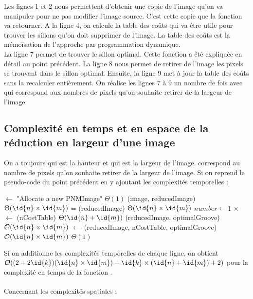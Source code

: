\documentclass[a4paper, 11pt, oneside]{article}
\begin{document}
Les lignes 1 et 2 nous permettent d'obtenir une copie de l'image qu'on va manipuler pour ne pas modifier l'image source. C'est cette copie que la fonction va retourner.
A la ligne 4, on calcule la table des coûts qui va être utile pour trouver les sillons qu'on doit supprimer de l'image. La table des coûts est la mémoïsation de l'approche par programmation dynamique.\\
La ligne 7 permet de trouver le sillon optimal. Cette fonction a été expliquée en détail au point précédent. La ligne 8 nous permet de retirer de l'image les pixels se trouvant dans le sillon optimal. Ensuite, la ligne 9 met à jour la table des coûts sans la recalculer entièrement. On réalise les lignes 7 à 9 un nombre  de fois avec  qui correspond aux nombres de pixels qu'on souhaite retirer de la largeur de l'image.

\subsection{Complexité en temps et en espace de la réduction en largeur d'une image}
On a toujours  qui est la hauteur et  qui est la largeur de l'image.  correspond au nombre de pixels qu'on souhaite retirer de la largeur de l'image. Si on reprend le pseudo-code du point précédent en y ajoutant les complexités temporelles :
\begin{codebox} %
        \li {} $\gets$ "Allocate a new PNMImage" \Comment $\Theta(1)$
        \li {}(image, reducedImage) \Comment $\Theta(\id{n} \times \id{m})$
        \li {} = (reducedImage) \Comment $\Theta(\id{n} \times \id{m})$
        \li
	    \li \For $number \gets 1$ \To {} \Comment {} $\times$
                \Do
         \li    	{} $\gets$ (nCostTable) \Comment $\Theta(\id{n} + \id{m})$
         \li		{}(reducedImage, optimalGroove) \Comment $\mathcal{O}(\id{n} \times \id{m})$
         \li		{} $\gets$ (reducedImage, nCostTable, optimalGroove) \Comment $\mathcal{O}(\id{n} \times \id{m})$
                \End
        \li
        \li \Return {} \Comment $\Theta(1)$
\end{codebox}

Si on additionne les complexités temporelles de chaque ligne, on obtient $\mathcal{O}((2+2\id{k})(\id{n} \times \id{m}) + \id{k} \times (\id{n} + \id{m}) + 2)$ pour la complexité en temps de la fonction .\\
\\
\noindent Concernant les complexités spatiales :
\end{document}
